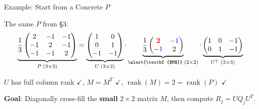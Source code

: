\documentclass[10pt]{beamer}
\theoremstyle{definition}
\newcommand{\x}[1]{\alert{\textbf{#1}}}
\newcommand{\pvt}[1]{{\color{red}\mathbf{#1}}}       %
\newcommand{\crs}[1]{{\color{blue}#1}}                %
\begin{document}
\begin{frame}{Example: Start from a Concrete $P$}

The same $P$ from \S3:
$$\underbrace{\frac{1}{3}\begin{pmatrix} 2 & -1 & -1 \\ -1 & 2 & -1 \\ -1 & -1 & 2 \end{pmatrix}}_{P\;(3 \times 3)} = \underbrace{\begin{pmatrix} 1 & 0 \\ 0 & 1 \\ -1 & -1 \end{pmatrix}}_{U\;(3 \times 2)} \cdot \underbrace{\frac{1}{3}\begin{pmatrix} \pvt{2} & \crs{-1} \\ \crs{-1} & 2 \end{pmatrix}}_{\x{$M$}\;(2 \times 2)} \cdot \underbrace{\begin{pmatrix} 1 & 0 & -1 \\ 0 & 1 & -1 \end{pmatrix}}_{U^T\;(2 \times 3)}$$

$U$ has full column rank $\checkmark$, \; $M = M^T$ $\checkmark$, \; $\operatorname{rank}(M) = 2 = \operatorname{rank}(P)$ $\checkmark$

\vspace{0.3em}

\x{Goal}: Diagonally cross-fill the \x{small} $2 \times 2$ matrix $M$, then compute $R_j = UQ_jU^T$.

\end{frame}
\end{document}
